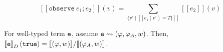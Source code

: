 \documentclass{tufte-handout}
\begin{document}
\begin{itemize}
\end{itemize}

$$
[\![\texttt{observe}~e_1; e_2]\!](v) = 
\sum_{\{v' \mid [\![{e_1}(v') = T\}]\!]} [\![{e_2}]\!](v)
$$

\begin{theorem}[Adequacy]
  For well-typed term $\texttt{e}$,
  assume $\texttt{e} \rightsquigarrow (\varphi, \varphi_A, w)$. Then, 
  $\left \llbracket {\texttt{e}} \right \rrbracket_D(\texttt{true}) = {\left \llbracket {(\varphi, w)} \right \rrbracket} / {\left \llbracket {(\varphi_A, w)} \right \rrbracket}$.
\end{theorem}





\end{document}
